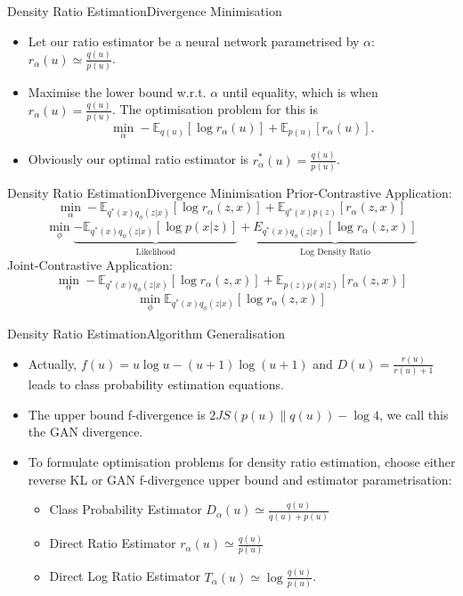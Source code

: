 \documentclass{beamer}
\newcommand{\E}{\mathbb{E}}
\begin{document}
\begin{frame}{Density Ratio Estimation}{Divergence Minimisation}
\begin{itemize}
\item Let our ratio estimator be a neural network parametrised by $\alpha$: $r_\alpha(u)\simeq \frac{q(u)}{p(u)}$.
\item Maximise the lower bound w.r.t. $\alpha$ until equality, which is when $r_\alpha(u)=\frac{q(u)}{p(u)}$. The optimisation problem for this is
\[\min_\alpha -\mathbb{E}_{q(u)}[\log r_\alpha(u)]+\mathbb{E}_{p(u)}[r_\alpha(u)].\]
\item Obviously our optimal ratio estimator is $r^*_\alpha(u)=\frac{q(u)}{p(u)}$.
\end{itemize}
\end{frame}
\begin{frame}{Density Ratio Estimation}{Divergence Minimisation}
Prior-Contrastive Application:
\[\min_\alpha -\E_{q^*(x)q_\phi(z|x)}[\log r_\alpha(z,x)]+\E_{q^*(x)p(z)}[r_\alpha (z,x)]\]
\[\min_\phi \underbrace{-\mathbb{E}_{q^*(x)q_\phi(z|x)}\left[\log p(x|z)\right]}_\text{Likelihood}+\underbrace{E_{q^*(x)q_\phi (z|x)}[\log r_\alpha(z,x)]}_\text{Log Density Ratio}\]
Joint-Contrastive Application:
\[\min_\alpha-\E_{q^*(x)q_\phi(z|x)}[\log r_\alpha(z,x)]+\E_{p(z)p(x|z)}[r_\alpha(z,x)]\]
\[\min_\phi \mathbb{E}_{q^*(x)q_\phi(z|x)}[\log r_\alpha(z,x)]\]
\end{frame}
\begin{frame}{Density Ratio Estimation}{Algorithm Generalisation}
\begin{itemize}
\item Actually, $f(u)=u\log u-(u+1)\log (u+1)$ and $D(u)=\frac{r(u)}{r(u)+1}$ leads to class probability estimation equations.
\item The upper bound f-divergence is $2JS(p(u)\|q(u))-\log 4$, we call this the GAN divergence.
\item To formulate optimisation problems for density ratio estimation, choose either reverse KL or GAN f-divergence upper bound and estimator parametrisation:
\begin{itemize}
\item Class Probability Estimator $D_\alpha(u)\simeq \frac{q(u)}{q(u)+p(u)}$
\item Direct Ratio Estimator $r_\alpha(u)\simeq \frac{q(u)}{p(u)}$
\item Direct Log Ratio Estimator $T_\alpha(u)\simeq\log \frac{q(u)}{p(u)}$.
\end{itemize}
\end{itemize}
\end{frame}
\end{document}
